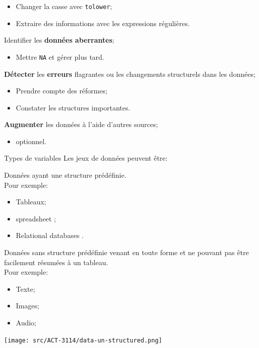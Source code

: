 \documentclass[10pt, french]{article}
\begin{document}
\begin{multicols*}{3}
\begin{algo2}
\begin{todolist}[leftmargin = *]
\begin{itemize}[leftmargin = *]
		\item	Changer la casse avec \texttt{tolower};
		\item	Extraire des informations avec les expressions régulières.
		\end{itemize}
	\item	Identifier les \textbf{données aberrantes};
		\begin{itemize}[leftmargin = *]
		\item	Mettre \texttt{NA} et gérer plus tard.
		\end{itemize}
	\item	\textbf{Détecter} les \textbf{erreurs} flagrantes ou les changements structurels dans les données;
		\begin{itemize}[leftmargin = *]
		\item	Prendre compte des réformes;
		\item	Constater les structures importantes.
		\end{itemize}
	\item	\textbf{Augmenter} les données à l'aide d'autres sources;
		\begin{itemize}[leftmargin = *]
		\item	optionnel.
		\end{itemize}
\end{todolist}
\end{algo2}

\begin{conceptgen}{Types de variables}
Les jeux de données peuvent être:
\begin{description}[leftmargin = *]
	\item[Structuré:]	Données ayant une structure prédéfinie.\\
		Pour exemple:
		\begin{itemize}[leftmargin = *]
		\item	Tableaux;
		\item	\og spreadsheet \fg{};
		\item	\og Relational databases \fg{}.
		\end{itemize}
	\item[Non structuré:]	Données sans structure prédéfinie venant en toute forme et ne pouvant pas être facilement résumées à un tableau.\\
		Pour exemple:
		\begin{multicols*}{3}
		\begin{itemize}[leftmargin = *]
		\item	Texte;
		\item	Images;
		\item	Audio;
		\end{itemize}
		\end{multicols*}
\end{description}
\begin{center}
	\texttt{[image: src/ACT-3114/data-un-structured.png]}
\end{center}


\end{conceptgen}
\end{multicols*}
\end{document}
